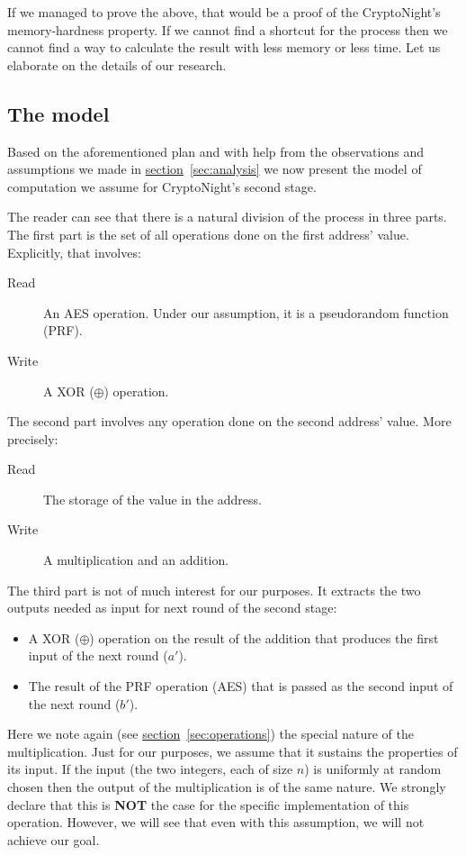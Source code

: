 If we managed to prove the above, that would be a proof of the CryptoNight's memory-hardness property. If we cannot find a shortcut for the process then we cannot find a way to calculate the result with less memory or less time. Let us elaborate on the details of our research.

\subsection{The model}
Based on the aforementioned plan and with help from the observations and assumptions we made in \hyperref[sec:analysis]{section}~\ref{sec:analysis} we now present the model of computation we assume for CryptoNight's second stage.

The reader can see that there is a natural division of the process in three parts. The first part is the set of all operations done on the first address' value. Explicitly, that involves:
\begin{description}
  \item [Read] An AES operation. Under our assumption, it is a pseudorandom function (PRF).
  \item [Write] A XOR ($\oplus$) operation.
\end{description}

The second part involves any operation done on the second address' value. More precisely:
\begin{description}
  \item [Read] The storage of the value in the address.
  \item [Write] A multiplication and an addition.
\end{description}

The third part is not of much interest for our purposes. It extracts the two outputs needed as input for next round of the second stage:
\begin{itemize}
  \item A XOR ($\oplus$) operation on the result of the addition that produces the first input of the next round ($a'$).
  \item The result of the PRF operation (AES) that is passed as the second input of the next round ($b'$).
\end{itemize}

Here we note again (see \hyperref[sec:operations]{section}~\ref{sec:operations}) the special nature of the multiplication. Just for our purposes, we assume that it sustains the properties of its input. If the input (the two integers, each of size $n$) is uniformly at random chosen then the output of the multiplication is of the same nature. We strongly declare that this is \textbf{NOT} the case for the specific implementation of this operation. However, we will see that even with this assumption, we will not achieve our goal.

